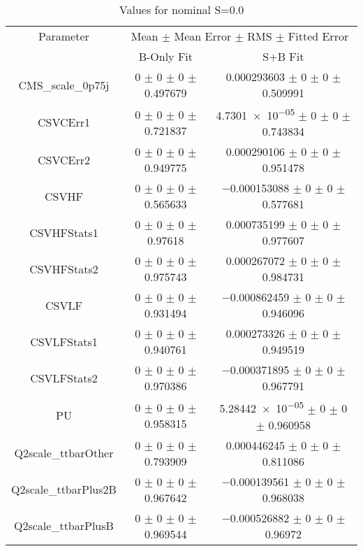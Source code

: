 \begin{table}
\centering
\caption{Values for nominal S=0.0}
\begin{tabular}{ccc}
\toprule
Parameter & \multicolumn{2}{c}{Mean $\pm$ Mean Error $\pm$ RMS $\pm$ Fitted Error}\\
 & B-Only Fit & S+B Fit\\
\midrule
CMS\_scale\_0p75j & \num{0} $\pm$ \num{0} $\pm$ \num{0} $\pm$ \num{0.497679} & \num{0.000293603} $\pm$ \num{0} $\pm$ \num{0} $\pm$ \num{0.509991}\\
CSVCErr1 & \num{0} $\pm$ \num{0} $\pm$ \num{0} $\pm$ \num{0.721837} & \num{4.7301e-05} $\pm$ \num{0} $\pm$ \num{0} $\pm$ \num{0.743834}\\
CSVCErr2 & \num{0} $\pm$ \num{0} $\pm$ \num{0} $\pm$ \num{0.949775} & \num{0.000290106} $\pm$ \num{0} $\pm$ \num{0} $\pm$ \num{0.951478}\\
CSVHF & \num{0} $\pm$ \num{0} $\pm$ \num{0} $\pm$ \num{0.565633} & \num{-0.000153088} $\pm$ \num{0} $\pm$ \num{0} $\pm$ \num{0.577681}\\
CSVHFStats1 & \num{0} $\pm$ \num{0} $\pm$ \num{0} $\pm$ \num{0.97618} & \num{0.000735199} $\pm$ \num{0} $\pm$ \num{0} $\pm$ \num{0.977607}\\
CSVHFStats2 & \num{0} $\pm$ \num{0} $\pm$ \num{0} $\pm$ \num{0.975743} & \num{0.000267072} $\pm$ \num{0} $\pm$ \num{0} $\pm$ \num{0.984731}\\
CSVLF & \num{0} $\pm$ \num{0} $\pm$ \num{0} $\pm$ \num{0.931494} & \num{-0.000862459} $\pm$ \num{0} $\pm$ \num{0} $\pm$ \num{0.946096}\\
CSVLFStats1 & \num{0} $\pm$ \num{0} $\pm$ \num{0} $\pm$ \num{0.940761} & \num{0.000273326} $\pm$ \num{0} $\pm$ \num{0} $\pm$ \num{0.949519}\\
CSVLFStats2 & \num{0} $\pm$ \num{0} $\pm$ \num{0} $\pm$ \num{0.970386} & \num{-0.000371895} $\pm$ \num{0} $\pm$ \num{0} $\pm$ \num{0.967791}\\
PU & \num{0} $\pm$ \num{0} $\pm$ \num{0} $\pm$ \num{0.958315} & \num{5.28442e-05} $\pm$ \num{0} $\pm$ \num{0} $\pm$ \num{0.960958}\\
Q2scale\_ttbarOther & \num{0} $\pm$ \num{0} $\pm$ \num{0} $\pm$ \num{0.793909} & \num{0.000446245} $\pm$ \num{0} $\pm$ \num{0} $\pm$ \num{0.811086}\\
Q2scale\_ttbarPlus2B & \num{0} $\pm$ \num{0} $\pm$ \num{0} $\pm$ \num{0.967642} & \num{-0.000139561} $\pm$ \num{0} $\pm$ \num{0} $\pm$ \num{0.968038}\\
Q2scale\_ttbarPlusB & \num{0} $\pm$ \num{0} $\pm$ \num{0} $\pm$ \num{0.969544} & \num{-0.000526882} $\pm$ \num{0} $\pm$ \num{0} $\pm$ \num{0.96972}\\

\end{tabular}
\end{table}
